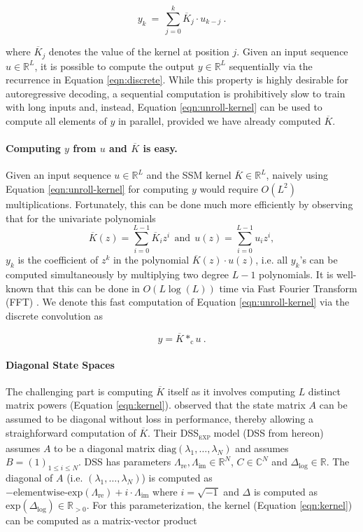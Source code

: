 \begin{equation}\label{eqn:unroll-kernel}
y_k \ = \ \sum_{j=0}^k \overline{K}_j\cdot u_{k-j}\ .
\end{equation}

where $\overline{K}_j$ denotes the value of the kernel at position $j$. Given an input sequence $u \in \mathbb{R}^L$, it is possible to compute the output $y \in \mathbb{R}^L$ sequentially via the recurrence in Equation \ref{eqn:discrete}. While this property is highly desirable for autoregressive decoding, a sequential computation is prohibitively slow to train with long inputs and, instead, Equation \ref{eqn:unroll-kernel} can be used to compute all elements of $y$ in parallel, provided we have already computed $\overline{K}$.

\paragraph{Computing $y$ from $u$ and $\overline{K}$ is easy.} Given an input sequence $u \in \mathbb{R}^L$ and the SSM kernel $\overline{K} \in \mathbb{R}^L$, naively using Equation \ref{eqn:unroll-kernel} for computing $y$ would require $O(L^2)$ multiplications. Fortunately, this can be done much more efficiently by observing that for the univariate polynomials 
$$\overline{K}(z) = \sum_{i=0}^{L-1} \overline{K}_i z^i \ \ \text{and}\ \ u(z) = \sum_{i=0}^{L-1} u_i z^i ,$$ $y_k$ is the coefficient of $z^k$ in the polynomial $\overline{K}(z) \cdot u(z)$, i.e. all $y_k$'s can be computed simultaneously by multiplying two degree $L-1$ polynomials. It is well-known that this can be done in $O(L\log(L))$ time via Fast Fourier Transform (FFT) \citep{cormen}. We denote this fast computation of Equation \ref{eqn:unroll-kernel} via the discrete convolution as

\begin{equation}\label{eqn:convolution}
y = \overline{K} *_\mathrm{c} u \ .
\end{equation}

\paragraph{Diagonal State Spaces} The challenging part is computing $\overline{K}$ itself as it involves computing $L$ distinct matrix powers (Equation \ref{eqn:kernel}). \cite{dss_gupta2022diagonal} observed that the state matrix $A$ can be assumed to be diagonal without loss in performance, thereby allowing a straighforward computation of $\overline{K}$. Their \textsc{DSS}\textsubscript{\textsc{exp}}  model (\textsc{DSS}  from hereon) assumes $A$ to be a diagonal matrix $\mathrm{diag}(\lambda_1, \ldots, \lambda_N)$ and assumes $B = (1)_{1 \leq i \leq N}$. \textsc{DSS}  has parameters $\Lambda_\mathrm{re}, \Lambda_\mathrm{im} \in \mathbb{R}^N$, $C \in \mathbb{C}^N$ and $\Delta_{\log} \in \mathbb{R}$. The diagonal of $A$ (i.e. $(\lambda_1, \ldots, \lambda_N)$) is computed as $-\mathrm{elementwise}\text{-}\mathrm{exp}(\Lambda_\mathrm{re}) + i\cdot \Lambda_\mathrm{im}$ where $i = \sqrt{-1}$ and $\Delta$ is computed as $\mathrm{exp}(\Delta_{\log}) \in \mathbb{R}_{> 0}$. For this parameterization, the kernel (Equation \ref{eqn:kernel}) can be computed as a matrix-vector product

